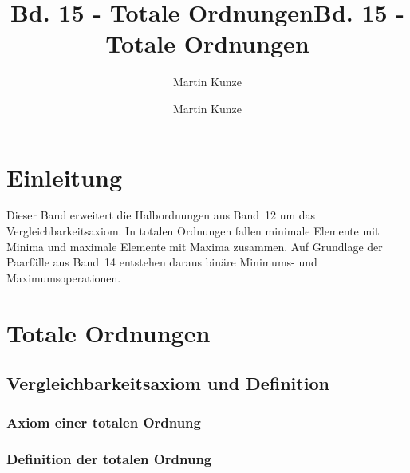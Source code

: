 \documentclass[main.tex]{subfiles}
\title{Bd. 15 - Totale Ordnungen}
\author{Martin Kunze}
\date{}
\begin{document}
\title{Bd. 15 - Totale Ordnungen}
\author{Martin Kunze}
\date{}
\hypersetup{pageanchor=false}
\maketitle
\hypersetup{pageanchor=true}
\setcounter{tocdepth}{3}
\tableofcontents
\setcounter{file}{15}
\renewcommand{\FormulaBandID}{15}
\chapter{Einleitung}

Dieser Band erweitert die Halbordnungen aus Band~12 um das
Vergleichbarkeitsaxiom. In totalen Ordnungen fallen minimale Elemente mit
Minima und maximale Elemente mit Maxima zusammen. Auf Grundlage der Paarfälle
aus Band~14 entstehen daraus binäre Minimums- und Maximumsoperationen.

\chapter{Totale Ordnungen}

\section{Vergleichbarkeitsaxiom und Definition}
\subsection{Axiom einer totalen Ordnung}


\subsection{Definition der totalen Ordnung}

\end{document}
